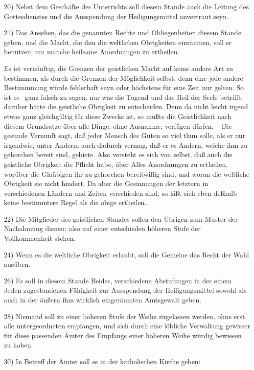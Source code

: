 {20) Nebst dem Geschäfte des Unterrichts soll diesem Stande auch die Leitung des Gottesdienstes und die Ausspendung der Heiligungsmittel anvertraut seyn. \par
21) Das Ansehen, das die genannten Rechte und Obliegenheiten diesem Stande geben, und die Macht, die ihm die weltlichen Obrigkeiten einräumen, soll er benützen, um manche heilsame Anordnungen zu ertheilen. \par
Es ist vernünftig, die Grenzen der geistlichen Macht auf keine andere Art zu bestimmen, als durch die  Grenzen der Möglichkeit selbst; denn eine jede andere Bestimmmung würde fehlerhaft seyn oder höchstens für eine Zeit nur gelten. So ist es \zB\ ganz falsch zu sagen, nur was die Tugend und das Heil der Seele betrifft, darüber hätte die geistliche Obrigkeit zu entscheiden. Denn da nicht leicht irgend etwas ganz gleichgültig für diese Zwecke ist, so müßte die Geistlichkeit nach diesem Grundsatze über alle Dinge, ohne Ausnahme, verfügen dürfen. -- Die gesunde Vernunft sagt, daß jeder Mensch des Guten so viel thun solle, als er nur irgendwie, unter Anderm auch dadurch vermag, daß er es Andern, welche ihm zu gehorchen bereit sind, gebiete. Also versteht es sich von selbst, daß auch die geistliche Obrigkeit die Pflicht habe, über Alles Anordnungen zu ertheilen, worüber die Glaübigen ihr zu gehorchen bereitwillig sind, und woran die weltliche Obrigkeit sie nicht hindert. Da aber die Gesinnungen der letztern in verschiedenen Ländern und Zeiten verschieden sind, so läßt sich eben deßhalb keine bestimmtere Regel als die obige ertheilen. \par
22) Die Mitglieder des geistlichen Standes sollen den Übrigen zum Muster der Nachahmung dienen; also auf einer entschieden höheren Stufe der Vollkommenheit stehen. \par
24) Wenn es die weltliche Obrigkeit erlaubt, soll die Gemeine das Recht der Wahl ausüben. \par
26) Es soll in diesem Stande Beides, verschiedene Abstufungen in der einem Jeden zugestandenen Fähigkeit zur Ausspendung der Heiligungsmittel sowohl als auch in der äußern ihm wirklich eingeräumten Amtsgewalt geben. \par
28) Niemand soll zu einer höheren Stufe der Weihe zugelassen werden, ohne erst alle untergeordneten empfangen, und sich durch eine löbliche Verwaltung gewisser für diese passenden Ämter des Empfangs einer höheren Weihe würdig bewiesen zu haben. \par
30) In Betreff der Ämter soll es in der katholischen Kirche geben: \par
}
